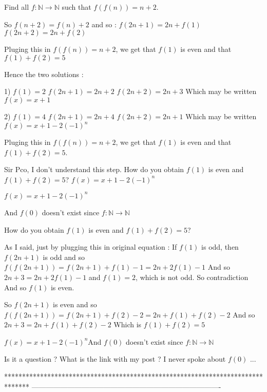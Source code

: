 \begin{solution}
	\begin{tcolorbox}Find all $f:\mathbb{N}\to \mathbb{N}$ such that $f(f(n))=n+2$.\end{tcolorbox}
So $f(n+2)=f(n)+2$ and so :
$f(2n+1)=2n+f(1)$
$f(2n+2)=2n+f(2)$

Pluging this in $f(f(n))=n+2$, we get that $f(1)$ is even and that $f(1)+f(2)=5$

Hence the two solutions :

1) $f(1)=2$
$f(2n+1)=2n+2$
$f(2n+2)=2n+3$
Which may be written $\boxed{f(x)=x+1}$

2) $f(1)=4$
$f(2n+1)=2n+4$
$f(2n+2)=2n+1$
Which may be written $\boxed{f(x)=x+1-2(-1)^n}$
\end{solution}



\begin{solution}
	\begin{tcolorbox}Pluging this in $f(f(n))=n+2$, we get that $f(1)$ is even and that $f(1)+f(2)=5$.\end{tcolorbox}
Sir Pco, I don't understand this step. How do you obtain $f(1)$ is even and $f(1)+f(2)=5$?
$\boxed{f(x)=x+1-2(-1)^n}$
\begin{tcolorbox}  $\boxed{f(x)=x+1-2(-1)^n}$  \end{tcolorbox}
And $f(0)$ doesn't exist since $f:\mathbb{N} \rightarrow \mathbb{N}$
\end{solution}



\begin{solution}
	\begin{tcolorbox}How do you obtain $f(1)$ is even and $f(1)+f(2)=5$?\end{tcolorbox}
As I said, just by plugging this in original equation :
If $f(1)$ is odd, then $f(2n+1)$ is odd and so $f(f(2n+1))=f(2n+1)+f(1)-1=2n+2f(1)-1$
And so $2n+3=2n+2f(1)-1$ and $f(1)=2$, which is not odd. So  contradiction
And so $f(1)$ is even.

So $f(2n+1)$ is even and so $f(f(2n+1))=f(2n+1)+f(2)-2=2n+f(1)+f(2)-2$
And so $2n+3=2n+f(1)+f(2)-2$
Which is $f(1)+f(2)=5$

\begin{tcolorbox}$\boxed{f(x)=x+1-2(-1)^n}$And $f(0)$ doesn't exist since $f:\mathbb{N} \rightarrow \mathbb{N}$\end{tcolorbox}
Is it a question ?
What is the link with my post ?
I never spoke about $f(0)$ ...



\end{solution}
*******************************************************************************
-------------------------------------------------------------------------------

